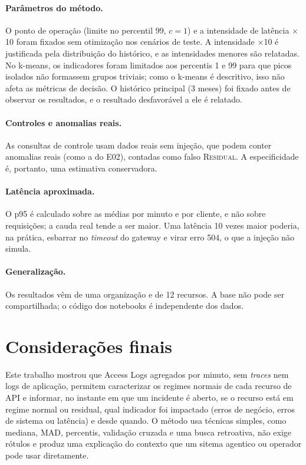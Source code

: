 \documentclass[sigconf,nonacm]{acmart}
\newcommand{\Residual}{\textsc{Residual}\xspace}
\begin{document}
\paragraph{Parâmetros do método.} O ponto de operação (limite no percentil 99, $c=1$) e a intensidade de latência $\times$10 foram fixados sem otimização nos cenários de teste. A intensidade $\times$10 é justificada pela distribuição do histórico, e as intensidades menores são relatadas. No k-means, os indicadores foram limitados aos percentis 1 e 99 para que picos isolados não formassem grupos triviais; como o k-means é descritivo, isso não afeta as métricas de decisão. O histórico principal (3 meses) foi fixado antes de observar os resultados, e o resultado desfavorável a ele é relatado.

\paragraph{Controles e anomalias reais.} As consultas de controle usam dados reais sem injeção, que podem conter anomalias reais (como a do E02), contadas como falso \Residual. A especificidade é, portanto, uma estimativa conservadora.

\paragraph{Latência aproximada.} O p95 é calculado sobre as médias por minuto e por cliente, e não sobre requisições; a cauda real tende a ser maior. Uma latência 10 vezes maior poderia, na prática, esbarrar no \emph{timeout} do gateway e virar erro 504, o que a injeção não simula.

\paragraph{Generalização.} Os resultados vêm de uma organização e de 12 recursos. A base não pode ser compartilhada; o código dos notebooks é independente dos dados.

\section{Considerações finais}\label{sec:conclusao}

Este trabalho mostrou que Access Logs agregados por minuto, sem \emph{traces} nem logs de aplicação, permitem caracterizar os regimes normais de cada recurso de API e informar, no instante em que um incidente é aberto, se o recurso está em regime normal ou residual, qual indicador foi impactado (erros de negócio, erros de sistema ou latência) e desde quando. O método usa técnicas simples, como mediana, MAD, percentis, validação cruzada e uma busca retroativa, não exige rótulos e produz uma explicação do contexto que um sitema agentico ou operador pode usar diretamente.
\end{document}
